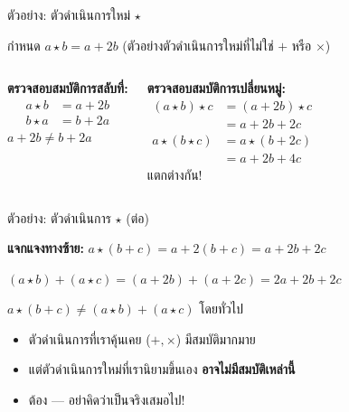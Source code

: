 \documentclass[11pt, aspectratio=169]{beamer}
\begin{document}
\begin{frame}{ตัวอย่าง: ตัวดำเนินการใหม่ $\star$}
  \begin{explanation}
    กำหนด $a \star b = a + 2b$ (ตัวอย่างตัวดำเนินการใหม่ที่ไม่ใช่ $+$ หรือ $\times$)
  \end{explanation}

  \begin{columns}[T]
      \textbf{ตรวจสอบสมบัติการสลับที่:}
      \begin{align*}
        a \star b &= a + 2b \\
        b \star a &= b + 2a
      \end{align*}
      $a + 2b \neq b + 2a$ 

      \medskip

      \textbf{ตรวจสอบสมบัติการเปลี่ยนหมู่:}
      \begin{align*}
        (a \star b) \star c &= (a+2b) \star c \\
        &= a + 2b + 2c \\
        a \star (b \star c) &= a \star (b+2c) \\
        &= a + 2b + 4c
      \end{align*}
      แตกต่างกัน!

      \medskip
  \end{columns}
\end{frame}

\begin{frame}{ตัวอย่าง: ตัวดำเนินการ $\star$ (ต่อ)}
  \begin{exambox}
    \textbf{แจกแจงทางซ้าย:} $a \star (b + c) = a + 2(b+c) = a + 2b + 2c$

    $(a \star b) + (a \star c) = (a+2b) + (a+2c) = 2a + 2b + 2c$

    \medskip
    $a \star (b+c) \neq (a \star b) + (a \star c)$ โดยทั่วไป

  \end{exambox}

  \begin{intuition}
    \begin{itemize}
      \item ตัวดำเนินการที่เราคุ้นเคย ($+, \times$) มีสมบัติมากมาย
      \item แต่ตัวดำเนินการใหม่ที่เรานิยามขึ้นเอง \textbf{อาจไม่มีสมบัติเหล่านี้}
      \item ต้อง  — อย่าคิดว่าเป็นจริงเสมอไป!
    \end{itemize}
  \end{intuition}
\end{frame}
\end{document}
